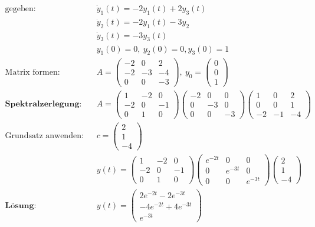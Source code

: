 \documentclass[11pt]{article}
\begin{document}
\begin{equation*}
\begin{split}
	\text{gegeben:} \quad & \dot y_1 (t) = -2y_1(t) + 2y_3(t) \\
	& \dot y_2(t) = -2y_1(t) - 3y_2 \\
	& \dot y_3(t) = -3y_3(t) \\
	& y_1(0) = 0,\ y_2(0) = 0, y_3(0) = 1 \\
	\text{Matrix formen:} \quad & A = \begin{pmatrix}
		-2 & 0 & 2 \\ -2 & -3 & -4 \\ 0 & 0 & -3
	\end{pmatrix},\ y_0 = \begin{pmatrix} 0 \\ 0 \\ 1 \end{pmatrix} \\
	\textbf{Spektralzerlegung:}\quad & A = \begin{pmatrix}
		1 & -2 & 0 \\ -2 & 0 & -1 \\ 0 & 1 & 0
	\end{pmatrix}\begin{pmatrix}
		-2 & 0 & 0 \\ 0 & -3 & 0 \\ 0 & 0 & -3
	\end{pmatrix}\begin{pmatrix}
		1 & 0 & 2 \\ 0 & 0 & 1 \\ -2 & -1 & -4
	\end{pmatrix} \\
	\text{Grundsatz anwenden:}\quad & c = \begin{pmatrix}
		2 \\ 1 \\ -4
	\end{pmatrix} \\
	& y(t) = \begin{pmatrix}
		1 & -2 & 0 \\ -2 & 0 & -1 \\ 0 & 1 & 0
	\end{pmatrix} \begin{pmatrix}
		e^{-2t} & 0 & 0 \\ 0 & e^{-3t} & 0 \\ 0 & 0 & e^{-3t}
	\end{pmatrix}\begin{pmatrix}
		2 \\ 1 \\ -4
	\end{pmatrix} \\
	\textbf{L{\"o}sung:} \quad & y(t) = \begin{pmatrix}
		2e^{-2t}-2e^{-3t} \\ -4e^{-2t} + 4 e^{-3t} \\ e^{-3t}
	\end{pmatrix}
\end{split}
\end{equation*}
\end{document}
